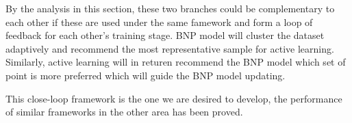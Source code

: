 By the analysis in this section, these two branches could be complementary to each other if these are used under the same famework and form a loop of feedback for each other's training stage. BNP model will cluster the dataset adaptively and recommend the most representative sample for active learning. Similarly, active learning will in returen recommend the BNP model which set of point is more preferred which will guide the BNP model updating. 

This close-loop framework is the one we are desired to develop, the performance of similar frameworks in the other area has been proved\cite{zhang2011close}.